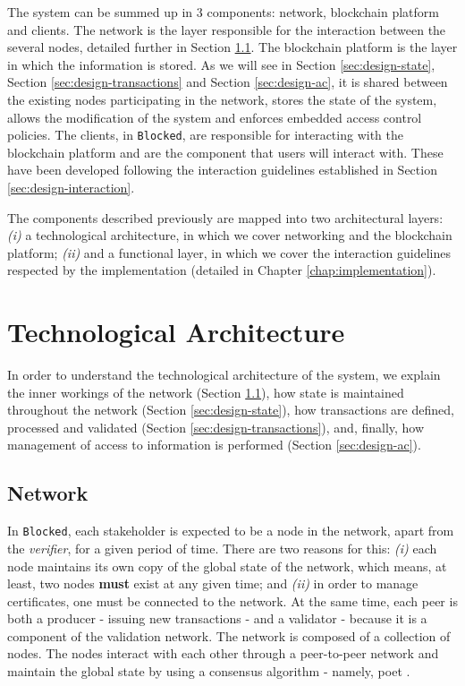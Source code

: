 The system can be summed up in 3 components: network, blockchain platform and clients. The network is the layer responsible for the interaction between the several nodes, detailed further in Section \ref{sec:design-network}. The blockchain platform is the layer in which the information is stored. As we will see in Section \ref{sec:design-state}, Section \ref{sec:design-transactions} and Section \ref{sec:design-ac}, it is shared between the existing nodes participating in the network, stores the state of the system, allows the modification of the system and enforces embedded access control policies. The clients, in \texttt{Blocked}, are responsible for interacting with the blockchain platform and are the component that users will interact with. These have been developed following the interaction guidelines established in Section \ref{sec:design-interaction}.

The components described previously are mapped into two architectural layers: \emph{(i)} a technological architecture, in which we cover networking and the blockchain platform; \emph{(ii)} and a functional layer, in which we cover the interaction guidelines respected by the implementation (detailed in Chapter \ref{chap:implementation}).

\section{Technological Architecture}
\label{sec:design-architecture}

In order to understand the technological architecture of the system, we explain the inner workings of the network (Section \ref{sec:design-network}), how state is maintained throughout the network (Section \ref{sec:design-state}), how transactions are defined, processed and validated (Section \ref{sec:design-transactions}), and, finally, how management of access to information is performed (Section \ref{sec:design-ac}).

\subsection{Network}
\label{sec:design-network}

In \texttt{Blocked}, each stakeholder is expected to be a node in the network, apart from the \textit{verifier}, for a given period of time. There are two reasons for this: \emph{(i)} each node maintains its own copy of the global state of the network, which means, at least, two nodes \textbf{must} exist at any given time; and \emph{(ii)} in order to manage certificates, one must be connected to the network. At the same time, each peer is both a producer - issuing new transactions - and a validator - because it is a component of the validation network. The network is composed of a collection of nodes. The nodes interact with each other through a peer-to-peer network and maintain the global state by using a consensus algorithm - namely, \gls{poet} \cite{intel_poet}.

